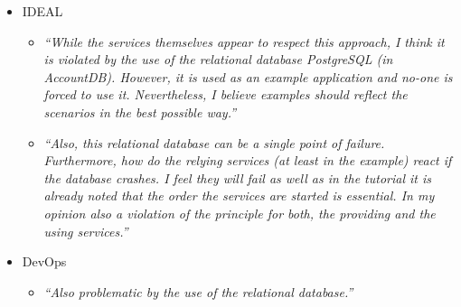 \begin{itemize}
  \item IDEAL
  \begin{itemize}
    \item \textit{``While the services themselves appear to respect this approach,
    I think it is violated by the use of the relational database PostgreSQL (in AccountDB).
	However, it is used as an example application and no-one is forced to use it.
	Nevertheless, I believe examples should reflect the scenarios in the best
	possible way.''}
	\item \textit{``Also, this relational database can be a single point of failure.
	Furthermore, how do the relying services (at least in the example) react if the
	database crashes. I feel they will fail as well as in the tutorial it is
	already noted that the order the services are started is essential. In my
	opinion also a violation of the \ms{} principle for both, the providing
	and the using services.''}
  \end{itemize}
  \item DevOps
   \begin{itemize}
    \item \textit{``Also problematic by the use of the relational database.''}
   \end{itemize}
\end{itemize}

